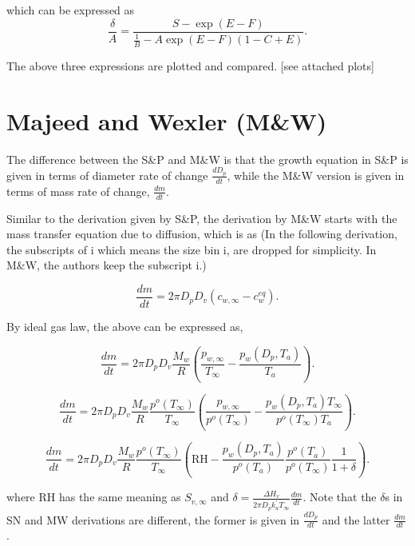 \documentclass[12pt]{amsart}
\begin{document}
which can be expressed as
\begin{equation}
\frac{\delta}{A}=\frac{S-\exp(E-F)}{\frac{1}{B}-A \exp(E-F) (1-C+E)}.
\end{equation}

The above three expressions are plotted and compared. [see attached plots]

\section{Majeed and Wexler (M\&W) }

The difference between the S\&P and M\&W is that the growth equation in S\&P is given in terms of diameter rate of change $\frac{d D_{p}}{dt}$, while the M\&W version is given in terms of mass rate of change, $\frac{dm}{dt}$.

Similar to the derivation given by S\&P, the derivation by M\&W starts with the mass transfer equation due to diffusion, which is as  (In the following derivation, the subscripts of i which means the size bin i,  are dropped for simplicity. In M\&W, the authors keep the subscript i.)

\begin{equation}\label{eqn:18}
\frac{dm}{dt}=2 \pi D_{p} D_{v} (c_{w, \infty} - c_{w}^{eq}).  
\end{equation}

By ideal gas law, the above can be expressed as,

\begin{equation}\label{eqn:19}
\frac{dm}{dt}=2 \pi D_{p} D_{v} \frac{M_{w}}{R} (\frac{p_{w, \infty}}{T_{\infty}} - \frac{p_{w}(D_{p}, T_{a})}{T_{a}}).
\end{equation}


\begin{equation}\label{eqn:20}
\frac{dm}{dt}=2 \pi D_{p} D_{v} \frac{M_{w}}{R}  \frac{p^{o}(T_{\infty})} {T_{\infty}} (\frac{p_{w, \infty}}{p^{o}(T_{\infty})} - \frac{p_{w}(D_{p}, T_{a}) T_{\infty}}{p^{o}(T_{\infty}) T_{a}}).
\end{equation}


\begin{equation}\label{eqn:MWgrowth1}
\frac{dm}{dt}=2 \pi D_{p} D_{v}  \frac{M_{w}}{R} \frac{p^{o}(T_{\infty})} {T_{\infty}} (\textrm{RH} - \frac{p_{w}(D_{p}, T_{a})}{p^{o}(T_{a})} \frac{p^{o}(T_{a})}{p^{o}(T_{\infty})}\frac{1}{1+\delta}).
\end{equation}

where RH has the same meaning as $S_{v, \infty}$ and $\delta=\frac{\Delta H_{v}}{2 \pi D_{p} k^{'}_{a} T_{\infty}} \frac{dm}{dt}$.
Note that the $\delta$s in SN and MW derivations are different, the former is given in $\frac{dD_{p}}{dt}$ and the latter $\frac{dm}{dt}$.
\end{document}
